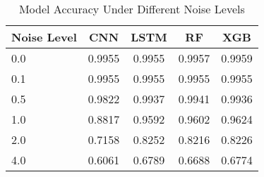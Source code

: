 
\begin{table}[htbp]
\centering
\caption{Model Accuracy Under Different Noise Levels}
\begin{tabular}{lcccc}
\hline
Noise Level & CNN & LSTM & RF & XGB \\
\hline
0.0 & 0.9955 & 0.9955 & 0.9957 & 0.9959 \\
0.1 & 0.9955 & 0.9955 & 0.9955 & 0.9955 \\
0.5 & 0.9822 & 0.9937 & 0.9941 & 0.9936 \\
1.0 & 0.8817 & 0.9592 & 0.9602 & 0.9624 \\
2.0 & 0.7158 & 0.8252 & 0.8216 & 0.8226 \\
4.0 & 0.6061 & 0.6789 & 0.6688 & 0.6774 \\
\hline
\end{tabular}
\label{tab:noise_impact}
\end{table}
